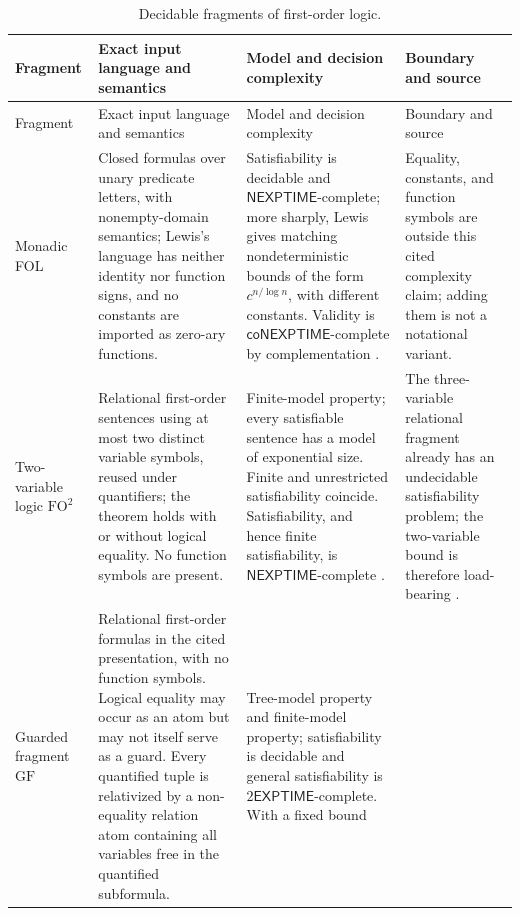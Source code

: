 \begin{landscape}
\begingroup\scriptsize\setlength{\tabcolsep}{3pt}
\begin{longtable}{@{}p{.90in}p{2.20in}p{2.10in}p{2.00in}@{}}
\caption{Decidable fragments of first-order logic.}
\label{tab:p02-decidable-fragments}\\
\toprule
Fragment & Exact input language and semantics & Model and decision complexity & Boundary and source \\ \midrule
\endfirsthead
\toprule
Fragment & Exact input language and semantics & Model and decision complexity & Boundary and source \\ \midrule
\endhead
Monadic FOL
\index{monadic first-order logic} &
Closed formulas over unary predicate letters, with nonempty-domain semantics;
Lewis's language has neither identity nor function signs, and no constants are
imported as zero-ary functions. &
Satisfiability is decidable and \(\mathsf{NEXPTIME}\)-complete; more sharply,
Lewis gives
matching nondeterministic bounds of the form \(c^{n/\log n}\), with different
constants.  Validity is \(\mathsf{coNEXPTIME}\)-complete by complementation
\cite{Lewis1980}. &
Equality, constants, and function symbols are outside this cited complexity
claim; adding them is not a notational variant. \\
\addlinespace
Two-variable logic \(\mathrm{FO}^{2}\)
\index{two-variable logic} &
Relational first-order sentences using at most two distinct variable symbols,
reused under quantifiers; the theorem holds with or without logical equality.
No function symbols are present. &
Finite-model property; every satisfiable sentence has a model of exponential
size.  Finite and unrestricted satisfiability coincide.  Satisfiability, and
hence finite satisfiability, is
\(\mathsf{NEXPTIME}\)-complete \cite{GradelKolaitisVardi1997}. &
The three-variable relational fragment already has an undecidable
satisfiability problem; the two-variable bound is therefore load-bearing
\cite{GradelKolaitisVardi1997}. \\
\addlinespace
Guarded fragment\newline\(\mathrm{GF}\)
\index{guarded fragment} &
Relational first-order formulas in the cited presentation, with no function
symbols.  Logical equality may occur as an atom but may not itself serve as a
guard.  Every quantified tuple is relativized by a non-equality relation atom
containing all variables free in the quantified subformula. &
Tree-model property and finite-model property; satisfiability is decidable and
general satisfiability is \(2\mathsf{EXPTIME}\)-complete.  With a fixed bound

\end{longtable}
\end{landscape}
